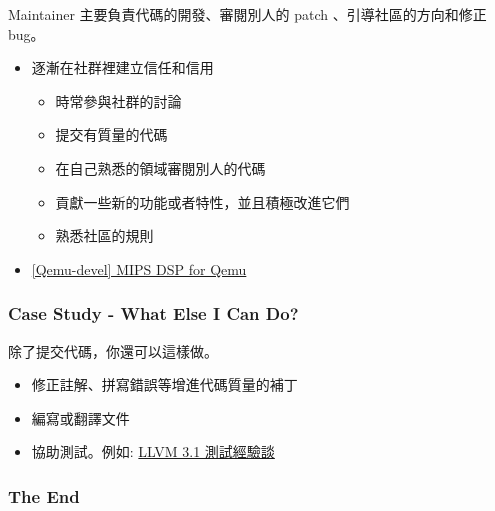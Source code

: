 \documentclass[CJK]{beamer}
\begin{document}
\begin{CJK}{UTF8}{bkai}
\begin{frame}
Maintainer 主要負責代碼的開發、審閱別人的 patch 、引導社區的方向和修正 bug。

\begin{itemize}
  \item 逐漸在社群裡建立信任和信用
  \begin{itemize}
    \item 時常參與社群的討論
    \item 提交有質量的代碼
    \item 在自己熟悉的領域審閱別人的代碼
    \item 貢獻一些新的功能或者特性，並且積極改進它們
    \item 熟悉社區的規則
  \end{itemize}
  \item \href{http://lists.gnu.org/archive/html/qemu-devel/2012-10/msg01361.html}{[Qemu-devel] MIPS DSP for Qemu}
\end{itemize}

\end{frame}

\begin{frame}
  \frametitle{Case Study - What Else I Can Do?}

除了提交代碼，你還可以這樣做。
\begin{itemize}
  \item 修正註解、拼寫錯誤等增進代碼質量的補丁
  \item 編寫或翻譯文件
  \item 協助測試。例如: \href{http://www.hellogcc.org/?p=98}{LLVM 3.1 測試經驗談}
\end{itemize}

\end{frame}

\begin{frame}
  \frametitle{The End}


\end{frame}

\end{CJK}
\end{document}
